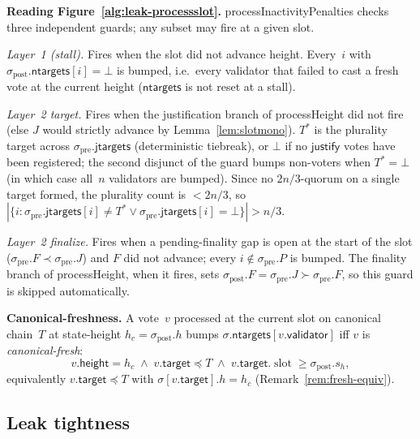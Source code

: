 \documentclass{article}
\newcommand{\slot}[0]{\ensuremath{\operatorname{\mathrm{slot}}}}
\newcommand{\target}{\mathsf{target}}
\newcommand{\height}{\mathsf{height}}
\newcommand{\validator}{\mathsf{validator}}
\newcommand{\just}{\ensuremath{\mathsf{justify}}\xspace}
\newcommand{\jtargets}{\mathsf{jtargets}}
\newcommand{\ntargets}{\mathsf{ntargets}}
\newcommand{\processHeight}{\textsf{processHeight}\xspace}
\newcommand{\processInactivityPenalties}{\textsf{processInactivityPenalties}\xspace}
\renewcommand{\paragraph}[1]{\vspace{7pt}\noindent\textbf{#1}}
\theoremstyle{plain}
\theoremstyle{definition}
\theoremstyle{remark}
\begin{document}
\paragraph{Reading Figure~\ref{alg:leak-processslot}.}
\processInactivityPenalties checks three independent guards; any subset may fire at a given slot.

\emph{Layer~1 (stall).} Fires when the slot did not advance height.
Every~$i$ with $\sigma_{\mathrm{post}}.\ntargets[i] = \bot$ is bumped, i.e.\ every validator that failed to cast a fresh vote at the current height ($\ntargets$ is not reset at a stall).

\emph{Layer~2 target.} Fires when the justification branch of \processHeight did not fire (else $J$ would strictly advance by Lemma~\ref{lem:slotmono}).
$T^*$ is the plurality target across $\sigma_{\mathrm{pre}}.\jtargets$ (deterministic tiebreak), or $\bot$ if no \just votes have been registered; the second disjunct of the guard bumps non-voters when $T^* = \bot$ (in which case all~$n$ validators are bumped).
Since no $2n/3$-quorum on a single target formed, the plurality count is $< 2n/3$, so $|\{i : \sigma_{\mathrm{pre}}.\jtargets[i] \neq T^* \vee \sigma_{\mathrm{pre}}.\jtargets[i] = \bot\}| > n/3$.

\emph{Layer~2 finalize.} Fires when a pending-finality gap is open at the start of the slot ($\sigma_{\mathrm{pre}}.F \prec \sigma_{\mathrm{pre}}.J$) and $F$ did not advance; every $i \notin \sigma_{\mathrm{pre}}.P$ is bumped.
The finality branch of \processHeight, when it fires, sets $\sigma_{\mathrm{post}}.F = \sigma_{\mathrm{pre}}.J \succ \sigma_{\mathrm{pre}}.F$, so this guard is skipped automatically.

\paragraph{Canonical-freshness.}
A vote~$v$ processed at the current slot on canonical chain~$T$ at state-height $h_c = \sigma_{\mathrm{post}}.h$ bumps $\sigma.\ntargets[v.\validator]$ iff $v$ is \emph{canonical-fresh}:
\[
  v.\height = h_c \;\wedge\; v.\target \preceq T \;\wedge\; v.\target.\slot \geq \sigma_{\mathrm{post}}.s_h,
\]
equivalently $v.\target \preceq T$ with $\sigma[v.\target].h = h_c$ (Remark~\ref{rem:fresh-equiv}).

\subsection{Leak tightness}
\end{document}
